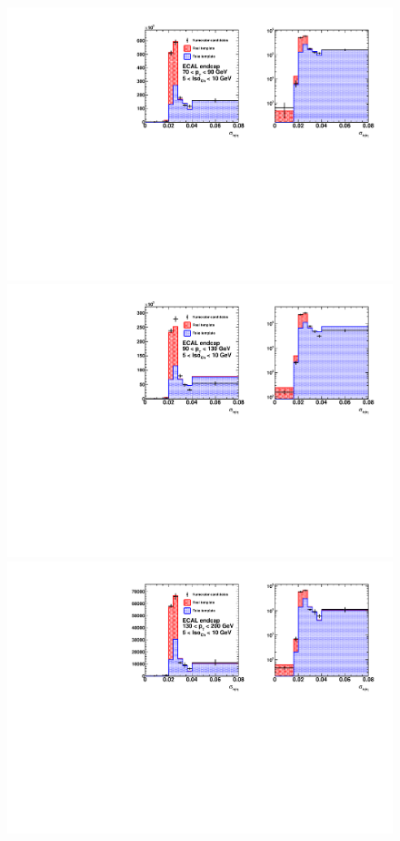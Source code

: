 \begin{figure}[!htbp]
\begin{multicols}{2}
		\includegraphics[scale=0.41]{figures/closure_test_h_pt70To90_chIso5To10_EE_Fake_sieie.pdf} \\
		\includegraphics[scale=0.41]{figures/closure_test_h_pt90To130_chIso5To10_EE_Fake_sieie.pdf} \\
		\includegraphics[scale=0.41]{figures/closure_test_h_pt130To200_chIso5To10_EE_Fake_sieie.pdf} \\

\end{multicols}
\end{figure}
